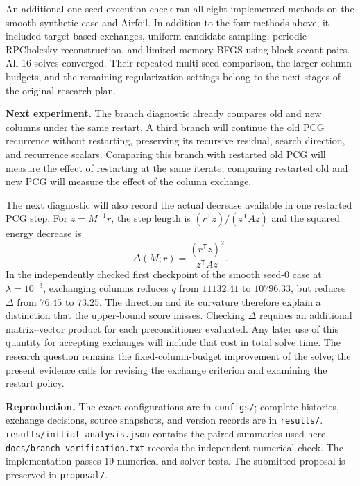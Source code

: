 \documentclass[11pt,letterpaper]{article}
\begin{document}




An additional one-seed execution check ran all eight implemented methods on
the smooth synthetic case and Airfoil. In addition to the four methods above,
it included target-based exchanges, uniform candidate sampling, periodic
RPCholesky reconstruction, and limited-memory BFGS using block secant pairs.
All 16 solves converged. Their repeated multi-seed comparison, the larger column
budgets, and the remaining regularization settings belong to the next stages
of the original research plan.

\newpage
\textbf{Next experiment.}
The branch diagnostic already compares old and new columns under the same
restart. A third branch will continue the old PCG recurrence without restarting,
preserving its recursive residual, search direction, and recurrence scalars. Comparing this branch
with restarted old PCG will measure the effect of restarting at the same
iterate; comparing restarted old and new PCG will measure the effect of the
column exchange.

The next diagnostic will also record the actual decrease available in one
restarted PCG step. For $z=M^{-1}r$, the step length is
$(r^{\mathsf T}z)/(z^{\mathsf T}Az)$ and the squared energy decrease is
\[
\Delta(M;r)=\frac{(r^{\mathsf T}z)^2}{z^{\mathsf T}Az}.
\]
In the independently checked first checkpoint of the smooth seed-0 case at
$\lambda=10^{-3}$, exchanging columns reduces $q$ from $11132.41$ to $10796.33$,
but reduces $\Delta$ from $76.45$ to $73.25$. The direction and its curvature
therefore explain a distinction that the upper-bound score misses.
Checking $\Delta$ requires an additional matrix--vector product for each
preconditioner evaluated. Any later use of this quantity for accepting exchanges
will include that cost in total solve time. The research question remains the
fixed-column-budget improvement of the solve; the present evidence calls for
revising the exchange criterion and examining the restart policy.

\textbf{Reproduction.}
The exact configurations are in \texttt{configs/}; complete histories, exchange
decisions, source snapshots, and version records are in \texttt{results/}.
\texttt{results/initial-analysis.json} contains the paired summaries used here.
\texttt{docs/branch-verification.txt} records the independent numerical check.
The implementation passes 19 numerical and solver tests. The submitted proposal
is preserved in \texttt{proposal/}.
\end{document}
